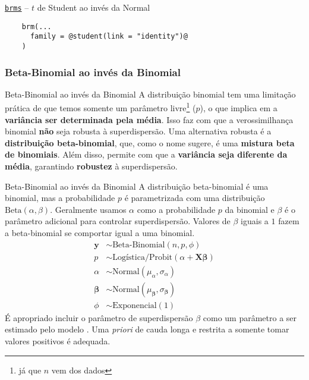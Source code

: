 \begin{frame}[fragile]{\href{https://paul-buerkner.github.io/brms/}{\texttt{brms}} -- $t$ de Student ao invés da Normal}
    \begin{lstlisting}
    brm(...
      family = @student(link = "identity")@
    )
    \end{lstlisting}
\end{frame}

\subsubsection{Beta-Binomial ao invés da Binomial}
\begin{frame}{Beta-Binomial ao invés da Binomial}
    A distribuição binomial tem uma limitação prática de que temos somente um
    parâmetro livre\footnote{já que $n$ vem dos dados} ($p$), o que implica em
    a \textbf{variância ser determinada pela média}. Isso faz com que a verossimilhança
    binomial \textbf{não} seja robusta à superdispersão.
    \vfill
    Uma alternativa robusta é a \textbf{distribuição beta-binomial}, que, como o nome
    sugere, é uma \textbf{mistura beta de binomiais}. Além disso, permite com que
    a \textbf{variância seja diferente da média}, garantindo \textbf{robustez}
    à superdispersão.
\end{frame}

\begin{frame}{Beta-Binomial ao invés da Binomial}
    A distribuição beta-binomial é uma binomial, mas a probabilidade $p$ é parametrizada
    com uma distribuição $\text{Beta}(\alpha, \beta)$. Geralmente usamos $\alpha$ como
    a probabilidade $p$ da binomial e $\beta$ é o parâmetro adicional para controlar
    superdispersão. Valores de $\beta$ iguais a $1$ fazem a beta-binomial se comportar
    igual a uma binomial.
    $$
    \begin{aligned}
        \boldsymbol{y} &\sim \text{Beta-Binomial}(n, p, \phi) \\
        p &\sim \text{Logística/Probit}(\alpha +  \mathbf{X} \boldsymbol{\beta}) \\
        \alpha &\sim \text{Normal}(\mu_\alpha, \sigma_\alpha) \\
        \boldsymbol{\beta} &\sim \text{Normal}(\mu_{\boldsymbol{\beta}}, \sigma_{\boldsymbol{\beta}}) \\
        \phi &\sim \text{Exponencial}(1)
    \end{aligned}
    $$
    \small
    É apropriado incluir o parâmetro de superdispersão $\beta$ como um parâmetro a
    ser estimado pelo modelo \parencite{gelman2013bayesian,mcelreath2020statistical}.
    Uma \textit{priori} de cauda longa e restrita a somente tomar valores positivos é
    adequada.
\end{frame}


